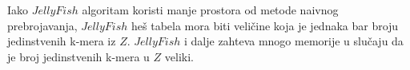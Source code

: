 \documentclass[12pt,oneside]{memoir}
\begin{document}
\begin{comment}
Neka je $h()$ heš funkcija i $H[0..\frac{N}{\alpha} - 1]$ heš tabela koja čuva niz k-mera, gde je $\alpha$ \textbf{faktor opterećenja}  \footnote{Broj koji kontroliše veličinu heš tabele} $(0 < \alpha \leq 1)$. Potrebno je izgraditi tabelu $Count[0..\frac{N}{\alpha} - 1]$ gde $Count[i]$ čuva broj pojavljivanja za k-mer $H[i]$. Za svaki k-mer iz $Z$ vrši se njegovo  heširanje u neku vrednost $H[i]$ gde je $i = h(z)$. Ako $H[i]$ nije prazan i $H[i] \neq z$, ne možemo čuvati $z$ u $H[i]$, tj. došlo je do kolizije. Ona može biti razrešena pomoću mehanizma otvorenog adresiranja. Na primer, kolizija se može razrešiti \textbf{linearnim popunjavanjem}. Ovom metodom pokušavamo da uvećamo indeks $i$ za jedan kada se kolizija dogodi sve dok je $H[i] = z$ ili je ulaz $H[i]$ prazan. Nakon sto su svi k-meri iz $Z$ obrađeni i sve kolizije razrešene, prikazuje se $(H[i], Count[i])$ za sve ulaze $H[i]$ različite od nule.

Funkcija $hashEntry()$ sa slike \ref{fig:6} (donji deo slike) ilustruje šemu linearnog popunjavanja za razrešavanje kolizije. Ako $hashEntry(z, h, \frac{N}{\alpha})$ vraća prazan ulaz $H[i]$, onda $z$ ne postoji u heš tabeli i postavljamo $H[i] = z$ i $Count[i] = 1$. U suprotnom, ako $hashEntry(z, h, \frac{N}{\alpha})$ vraća ulaz $H[i] = z$, uvećavamo $Count[i]$ za jedan. Nakon sto su svi k-meri iz $Z$ obrađeni, prikazujemo $(H[i], Count[i])$ za sve ulaze $H[i]$ različite od nule.

JellyFish algoritam je detaljnije objašnjen na slici \ref{fig:6} (gorni deo slike), dok slika \ref{fig:5} (b) daje primer koji ga ilustruje. On je efikasniji, ukoliko ne postoji kolizija. U praksi je očekivani broj kolizija manji, ukoliko za faktor opterećenja važi $\alpha \leq 0.7$. Zatim, očekivano vreme izvršavanja je $O(N)$. Što se tiče prostorne složenosti, tabele $H[]$ i $Count[]$ zahtevaju $\frac{N}{\alpha}(2k + 32)$ bitova, pod pretpostavkom da broj zauzima 32 bita. Gore pomenuta ideja smanjivanja veličine heš tabele je iskorišćena u $JellyFish$ algoritmu.

\begin{figure}[!ht]
  \centering
  \texttt{[image: Jellyfish5\_9.PNG]}
  \caption{Jellyfish algoritam i funkcija hashEntry}
  \label{fig:6}
  \source{\cite{WingKinSung} str. 132, slika 5.9}
\end{figure}

\end{comment}

Iako $JellyFish$ algoritam koristi manje prostora od metode naivnog prebrojavanja, $JellyFish$ heš tabela mora biti veličine koja je jednaka bar broju jedinstvenih k-mera iz $Z$. $JellyFish$ i dalje zahteva mnogo memorije u slučaju da je broj jedinstvenih k-mera u $Z$ veliki.
\end{document}
